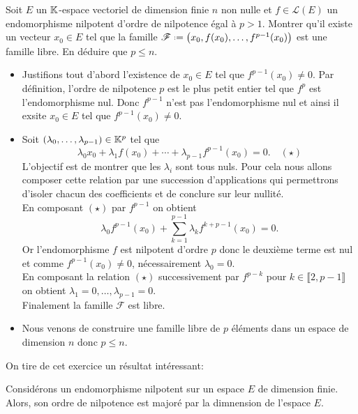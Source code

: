 \begin{exercice}
    Soit $E$ un $\mathbb{K}$-espace vectoriel de dimension finie $n$ non nulle et $f \in \mathscr{L}(E)$ un endomorphisme nilpotent d'ordre de nilpotence égal à $p > 1$. Montrer qu'il existe un vecteur $x_0 \in E$ tel que la famille $\mathscr{F} \defeq \big(x_0, f(x_0), \dots, f^{p-1}(x_0) \big)$ est une famille libre. En déduire que $p \leqslant n$. 
\end{exercice}    

\begin{solution}
    \begin{itemize}
        \item Justifions tout d'abord l'existence de $x_0 \in E$ tel que $f^{p-1}(x_0) \not= 0$. Par définition, l'ordre de nilpotence $p$ est le plus petit entier tel que $f^p$ est l'endomorphisme nul. Donc $f^{p-1}$ n'est pas l'endomorphisme nul et ainsi il exsite $x_0 \in E$ tel que $f^{p-1}(x_0) \not= 0$.
        \item Soit $(\lambda_0, \dots, \lambda_{p-1}) \in \mathbb{K}^p$ tel que 
        $$\lambda_0 x_0 + \lambda_1 f(x_0) + \cdots + \lambda_{p-1} f^{p-1}(x_0) = 0. \quad (\star)$$
        L'objectif est de montrer que les $\lambda_i$ sont tous nuls. Pour cela nous allons composer cette relation par une succession d'applications qui permettrons d'isoler chacun des coefficients et de conclure sur leur nullité. \\
        En composant $(\star)$ par $f^{p-1}$ on obtient
        $$\lambda_0 f^{p-1}(x_0) + \sum_{k=1}^{p-1} \lambda_k f^{k + p-1}(x_0) = 0.$$
        Or l'endomorphisme $f$ est nilpotent d'ordre $p$ donc le deuxième terme est nul et comme $f^{p-1}(x_0) \not= 0$, nécessairement $\lambda_0 = 0$. \\
        En composant la relation $(\star)$ successivement par $f^{p - k}$ pour $k \in \llbracket 2, p-1 \rrbracket$ on obtient $\lambda_1 = 0, \dots, \lambda_{p-1} = 0$. \\
        Finalement la famille $\mathscr{F}$ est libre.
        \item Nous venons de construire une famille libre de $p$ éléments dans un espace de dimension $n$ donc $p \leqslant n$. 
    \end{itemize}
\end{solution}
On tire de cet exercice un résultat intéressant:
\begin{prop}
    Considérons un endomorphisme nilpotent sur un espace $E$ de dimension finie. Alors, son ordre de nilpotence est majoré par la dimnension de l'espace $E$.
\end{prop}
